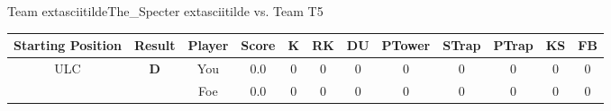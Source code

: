 \documentclass[a4paper,12pt]{article}
\begin{document}
\begin{tabular}[t]{| c | c | c | c | c | c | c | c | c | c | c | c
      |}
                      
      
                      
      
                      
                        \hline
                      \end{tabular}
                      
  \vspace*{2em}
  \par {\large {\color{Gray} Team} 	extasciitildeThe\_Specter	extasciitilde {\color{Gray}
      vs. Team} T5}
  \newline
  \begin{tabular}[t]{| c | c | c | c | c | c | c | c | c | c | c | c
      |}
    \hline
    Starting Position & \textbf{Result} & Player & \textbf{Score} & K & RK & DU & PTower & STrap & PTrap & KS & FB \\
    
      
                      
      
                      
      
                      
      
                      
      
                      
      
                      
      
                      
      
                      
      
                      
      
        \hline
        \multirow{2}{*}{  ULC  } &
              \multirow{2}{*}{  
                  \textbf{D}  } & 
                    \cellcolor{yellow!25} You & \cellcolor{yellow!25} 0.0 & \cellcolor{yellow!25} 0 &
                    \cellcolor{yellow!25} 0 & \cellcolor{yellow!25} 0 & \cellcolor{yellow!25} 0 &
                    \cellcolor{yellow!25} 0 & \cellcolor{yellow!25} 0 & \cellcolor{yellow!25} 0 &
                    \cellcolor{yellow!25} 0 \\
                    \cline{3-12}
                    & & \cellcolor{red!15} Foe & \cellcolor{red!15} 0.0 & \cellcolor{red!15} 0 & \cellcolor{red!15}
                    0 & \cellcolor{red!15} 0
                    & \cellcolor{red!15} 0 & \cellcolor{red!15}
                    0 & \cellcolor{red!15} 0 
                    & \cellcolor{red!15} 0 & \cellcolor{red!15}
                    0 \\
                    
                      
      

\end{tabular}
\end{document}
